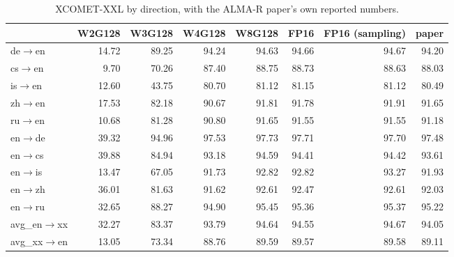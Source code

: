 \begin{table}[t]
\centering
\small
\begin{tabular}{lrrrrrrr}
\toprule
& W2G128 & W3G128 & W4G128 & W8G128 & FP16 & FP16 (sampling) & paper \\
\midrule
de$\rightarrow$en & 14.72 & 89.25 & 94.24 & 94.63 & 94.66 & 94.67 & 94.20 \\
cs$\rightarrow$en & 9.70 & 70.26 & 87.40 & 88.75 & 88.73 & 88.63 & 88.03 \\
is$\rightarrow$en & 12.60 & 43.75 & 80.70 & 81.12 & 81.15 & 81.12 & 80.49 \\
zh$\rightarrow$en & 17.53 & 82.18 & 90.67 & 91.81 & 91.78 & 91.91 & 91.65 \\
ru$\rightarrow$en & 10.68 & 81.28 & 90.80 & 91.65 & 91.55 & 91.55 & 91.18 \\
en$\rightarrow$de & 39.32 & 94.96 & 97.53 & 97.73 & 97.71 & 97.70 & 97.48 \\
en$\rightarrow$cs & 39.88 & 84.94 & 93.18 & 94.59 & 94.41 & 94.42 & 93.61 \\
en$\rightarrow$is & 13.47 & 67.05 & 91.73 & 92.82 & 92.82 & 93.27 & 91.93 \\
en$\rightarrow$zh & 36.01 & 81.63 & 91.62 & 92.61 & 92.47 & 92.61 & 92.03 \\
en$\rightarrow$ru & 32.65 & 88.27 & 94.90 & 95.45 & 95.36 & 95.37 & 95.22 \\
\midrule
avg\_en$\rightarrow$xx & 32.27 & 83.37 & 93.79 & 94.64 & 94.55 & 94.67 & 94.05 \\
avg\_xx$\rightarrow$en & 13.05 & 73.34 & 88.76 & 89.59 & 89.57 & 89.58 & 89.11 \\
\bottomrule
\end{tabular}
\caption{XCOMET-XXL by direction, with the ALMA-R paper's own reported numbers.}
\label{tab:xcomet-xxl}
\end{table}

